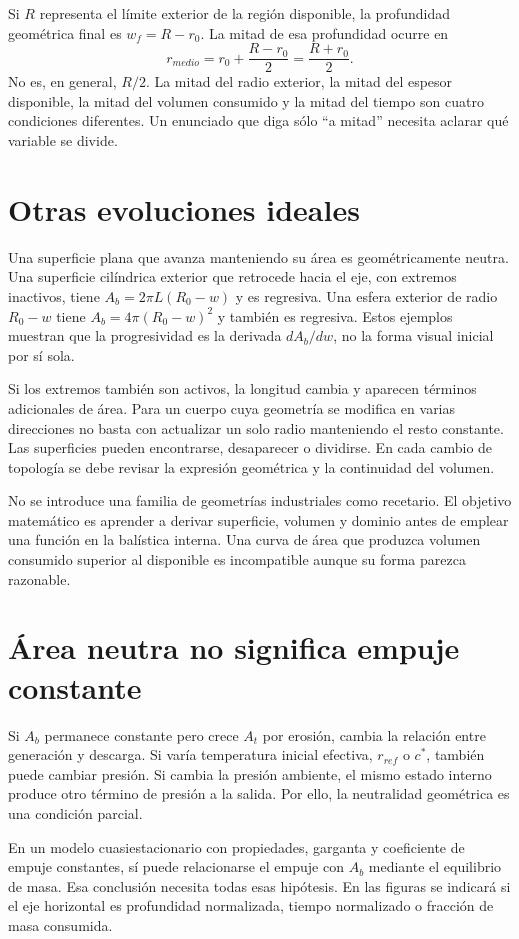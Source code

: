 Si $R$ representa el límite exterior de la región disponible, la profundidad geométrica final es $w_f=R-r_0$. La mitad de esa profundidad ocurre en
\[
 r_{medio}=r_0+\frac{R-r_0}{2}=\frac{R+r_0}{2}.
\]
No es, en general, $R/2$. La mitad del radio exterior, la mitad del espesor disponible, la mitad del volumen consumido y la mitad del tiempo son cuatro condiciones diferentes. Un enunciado que diga sólo ``a mitad'' necesita aclarar qué variable se divide.
\section{Otras evoluciones ideales}
Una superficie plana que avanza manteniendo su área es geométricamente neutra. Una superficie cilíndrica exterior que retrocede hacia el eje, con extremos inactivos, tiene $A_b=2\pi L(R_0-w)$ y es regresiva. Una esfera exterior de radio $R_0-w$ tiene $A_b=4\pi(R_0-w)^2$ y también es regresiva. Estos ejemplos muestran que la progresividad es la derivada $dA_b/dw$, no la forma visual inicial por sí sola.

Si los extremos también son activos, la longitud cambia y aparecen términos adicionales de área. Para un cuerpo cuya geometría se modifica en varias direcciones no basta con actualizar un solo radio manteniendo el resto constante. Las superficies pueden encontrarse, desaparecer o dividirse. En cada cambio de topología se debe revisar la expresión geométrica y la continuidad del volumen.

No se introduce una familia de geometrías industriales como recetario. El objetivo matemático es aprender a derivar superficie, volumen y dominio antes de emplear una función en la balística interna. Una curva de área que produzca volumen consumido superior al disponible es incompatible aunque su forma parezca razonable.
\section{Área neutra no significa empuje constante}
Si $A_b$ permanece constante pero crece $A_t$ por erosión, cambia la relación entre generación y descarga. Si varía temperatura inicial efectiva, $r_{ref}$ o $c^*$, también puede cambiar presión. Si cambia la presión ambiente, el mismo estado interno produce otro término de presión a la salida. Por ello, la neutralidad geométrica es una condición parcial.

En un modelo cuasiestacionario con propiedades, garganta y coeficiente de empuje constantes, sí puede relacionarse el empuje con $A_b$ mediante el equilibrio de masa. Esa conclusión necesita todas esas hipótesis. En las figuras se indicará si el eje horizontal es profundidad normalizada, tiempo normalizado o fracción de masa consumida.
